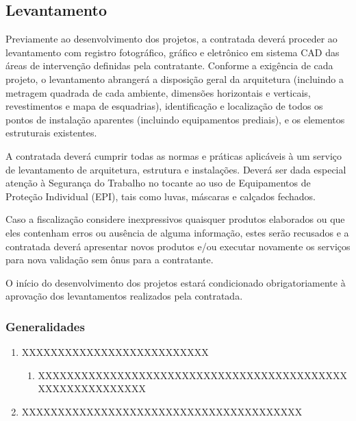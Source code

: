 \subsection{Levantamento} \label{subsection: etapa-LV}

Previamente ao desenvolvimento dos projetos, a contratada deverá proceder ao levantamento com registro fotográfico, gráfico e eletrônico em sistema CAD das áreas de intervenção definidas pela contratante. Conforme a exigência de cada projeto, o levantamento abrangerá a disposição geral da arquitetura (incluindo a metragem quadrada de cada ambiente, dimensões horizontais e verticais, revestimentos e mapa de esquadrias), identificação e localização de todos os pontos de instalação aparentes (incluindo equipamentos prediais), e os elementos estruturais existentes.

A contratada deverá cumprir todas as normas e práticas aplicáveis à um serviço de levantamento de arquitetura, estrutura e instalações. Deverá ser dada especial atenção à Segurança do Trabalho no tocante ao uso de Equipamentos de Proteção Individual (EPI), tais como luvas, máscaras e calçados fechados.

Caso a fiscalização considere inexpressivos quaisquer produtos elaborados ou que eles contenham erros ou ausência de alguma informação, estes serão recusados e a contratada deverá apresentar novos produtos e/ou executar novamente os serviços para nova validação sem ônus para a contratante.

O início do desenvolvimento dos projetos estará condicionado obrigatoriamente à aprovação dos levantamentos realizados pela contratada.

\subsubsection{Generalidades}
	\begin{enumerate}

		\item XXXXXXXXXXXXXXXXXXXXXXXXXX
			\begin{enumerate}
				
				\item XXXXXXXXXXXXXXXXXXXXXXXXXXXXXXXXXXXXXXXXXXXXXXXXXXXXXXXXXX
			
			\end{enumerate}
		
		\item XXXXXXXXXXXXXXXXXXXXXXXXXXXXXXXXXXXXXXX
	\end{enumerate}

